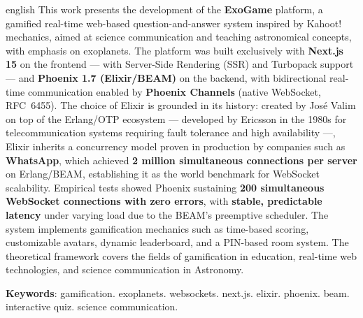 \documentclass[
	12pt,
	openany,
	oneside,
	a4paper,
	english,
	brazil
]{abntex2}
\newcommand{\listofquadrosname}{Lista de quadros}
\begin{document}
\begin{resumo}[Abstract]
\begin{otherlanguage*}{english}
This work presents the development of the \textbf{ExoGame} platform, a gamified real-time web-based question-and-answer system inspired by Kahoot! mechanics, aimed at science communication and teaching astronomical concepts, with emphasis on exoplanets. The platform was built exclusively with \textbf{Next.js 15} on the frontend --- with Server-Side Rendering (SSR) and Turbopack support --- and \textbf{Phoenix 1.7 (Elixir/BEAM)} on the backend, with bidirectional real-time communication enabled by \textbf{Phoenix Channels} (native WebSocket, RFC~6455). The choice of Elixir is grounded in its history: created by José Valim on top of the Erlang/OTP ecosystem --- developed by Ericsson in the 1980s for telecommunication systems requiring fault tolerance and high availability ---, Elixir inherits a concurrency model proven in production by companies such as \textbf{WhatsApp}, which achieved \textbf{2 million simultaneous connections per server} on Erlang/BEAM, establishing it as the world benchmark for WebSocket scalability. Empirical tests showed Phoenix sustaining \textbf{200 simultaneous WebSocket connections with zero errors}, with \textbf{stable, predictable latency} under varying load due to the BEAM's preemptive scheduler. The system implements gamification mechanics such as time-based scoring, customizable avatars, dynamic leaderboard, and a PIN-based room system. The theoretical framework covers the fields of gamification in education, real-time web technologies, and science communication in Astronomy.

\vspace{\onelineskip}
\noindent
\textbf{Keywords}: gamification. exoplanets. websockets. next.js. elixir. phoenix. beam. interactive quiz. science communication.
\end{otherlanguage*}
\end{resumo}

\listoffigures*
\clearpage

\pdfbookmark[0]{\listofquadrosname}{loq}
\listofquadros*
\clearpage

\listoftables*
\clearpage
\end{document}
